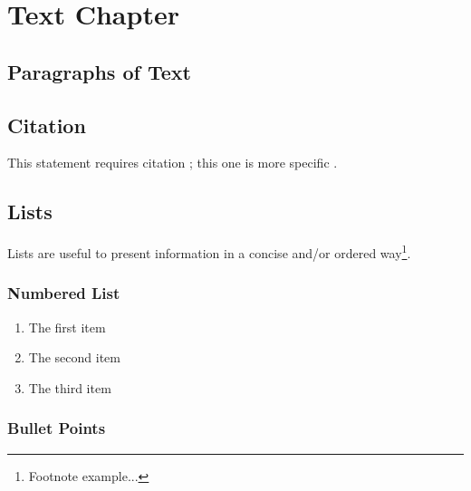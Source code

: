 

\chapter{Text Chapter}

\section{Paragraphs of Text}

\lipsum[1-7] %


\section{Citation}

This statement requires citation \cite{book_key}; this one is more specific \cite[122]{article_key}.


\section{Lists}

Lists are useful to present information in a concise and/or ordered way\footnote{Footnote example...}.

\subsection{Numbered List}

\begin{enumerate}
	\item The first item
	\item The second item
	\item The third item
\end{enumerate}

\subsection{Bullet Points}

